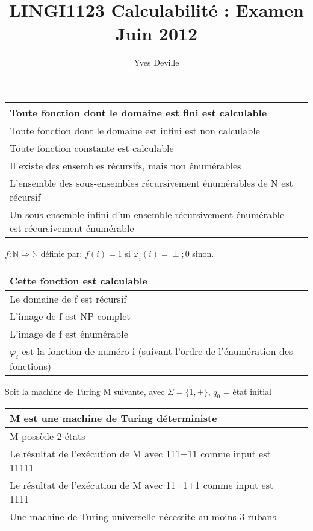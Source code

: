 \documentclass[12pt, a4paper]{article}
\title{LINGI1123 Calculabilité : Examen Juin 2012}
\author{Yves Deville}
\begin{document}
\maketitle

\begin{tabular}{p{13cm}|l}
Toute fonction dont le domaine est fini est calculable & \\ \hline
Toute fonction dont le domaine est infini est non calculable & \\ \hline
Toute fonction constante est calculable & \\ \hline
Il existe des ensembles récursifs, mais non énumérables & \\ \hline
L'ensemble des sous-ensembles récursivement énumérables de N est récursif & \\ \hline
Un sous-ensemble infini d'un ensemble récursivement énumérable est récursivement énumérable & \\ \hline
\end{tabular}

$f: \mathbb{N} \Rightarrow \mathbb{N}$ définie par: $f(i) = 1$ si $\varphi_i(i) = \perp; 0$ sinon.

\begin{tabular}{p{13cm}|l}
Cette fonction est calculable & \\ \hline
Le domaine de f est récursif & \\ \hline
L'image de f est NP-complet & \\ \hline
L'image de f est énumérable & \\ \hline
$\varphi_{i}$ est la fonction de numéro i (suivant l'ordre de l'énumération des fonctions) & \\ \hline
\end{tabular}

Soit la machine de Turing M suivante, avec $\Sigma = \{1, +\}$, $q_{0}$ = état initial

\begin{tabular}{p{13cm}|l}
M est une machine de Turing déterministe & \\ \hline
M possède 2 états & \\ \hline
Le résultat de l'exécution de M avec 111+11 comme input est 11111 & \\ \hline
Le résultat de l'exécution de M avec 11+1+1 comme input est 1111 & \\ \hline
Une machine de Turing universelle nécessite au moins 3 rubans & \\ \hline
\end{tabular}
\end{document}
